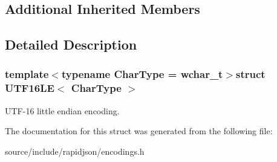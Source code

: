 \subsection*{Additional Inherited Members}


\subsection{Detailed Description}
\subsubsection*{template$<$typename Char\+Type = wchar\+\_\+t$>$struct U\+T\+F16\+L\+E$<$ Char\+Type $>$}

U\+T\+F-\/16 little endian encoding. 

The documentation for this struct was generated from the following file\+:\begin{DoxyCompactItemize}
\item 
source/include/rapidjson/encodings.\+h\end{DoxyCompactItemize}
